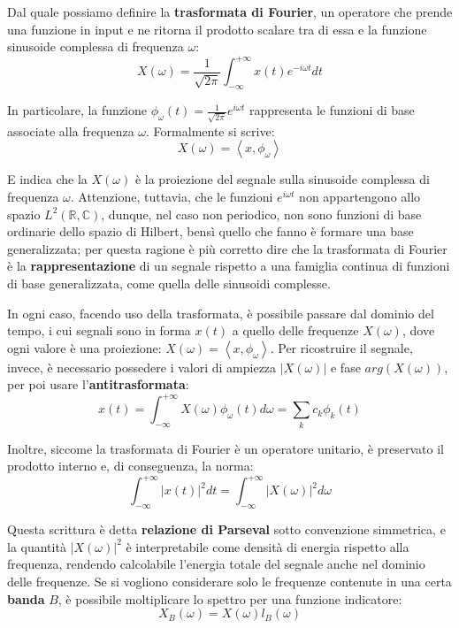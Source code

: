 \noindent Dal quale possiamo definire la \textbf{trasformata di Fourier}, un operatore che prende una funzione in input e ne ritorna il prodotto
scalare tra di essa e la funzione sinusoide complessa di frequenza $\omega$: \[
    X(\omega) = \frac{1}{\sqrt{2\pi}}\int_{-\infty}^{+\infty} x(t)e^{-i\omega t} dt
\]

\noindent In particolare, la funzione $\phi_\omega(t) = \frac{1}{\sqrt{2\pi}}e^{i\omega t}$ rappresenta le funzioni di base associate alla frequenza
$\omega$. Formalmente si scrive: \[
    X(\omega) = \left<x, \phi_\omega \right>
\]

\noindent E indica che la $X(\omega)$ è la proiezione del segnale sulla sinusoide complessa di frequenza $\omega$. Attenzione, tuttavia, che le funzioni
$e^{i\omega t}$ non appartengono allo spazio $L^2(\mathbb{R}, \mathbb{C})$, dunque, nel caso non periodico, non sono funzioni di base ordinarie dello
spazio di Hilbert, bensì quello che fanno è formare una base generalizzata; per questa ragione è più corretto dire che la trasformata di Fourier è la
\textbf{rappresentazione} di un segnale rispetto a una famiglia continua di funzioni di base generalizzata, come quella delle sinusoidi complesse.\par
In ogni caso, facendo uso della trasformata, è possibile passare dal dominio del tempo, i cui segnali sono in forma $x(t)$ a quello delle frequenze
$X(\omega)$, dove ogni valore è una proiezione: $X(\omega) = \left<x, \phi_\omega \right>$. Per ricostruire il segnale, invece, è necessario possedere i
valori di ampiezza $|X(\omega)|$ e fase $arg(X(\omega))$, per poi usare l'\textbf{antitrasformata}: \[
    x(t) = \int_{-\infty}^{+\infty} X(\omega)\phi_\omega(t) d\omega = \sum_k c_k\phi_k(t)
\]

\noindent Inoltre, siccome la trasformata di Fourier è un operatore unitario, è preservato il prodotto interno e, di conseguenza, la norma: \[
    \int_{-\infty}^{+\infty} |x(t)|^2 dt = \int_{-\infty}^{+\infty} |X(\omega)|^2 d\omega
\]

\noindent Questa scrittura è detta \textbf{relazione di Parseval} sotto convenzione simmetrica, e la quantità $|X(\omega)|^2$ è interpretabile come
densità di energia rispetto alla frequenza, rendendo calcolabile l'energia totale del segnale anche nel dominio delle frequenze. Se si vogliono
considerare solo le frequenze contenute in una certa \textbf{banda} $B$, è possibile moltiplicare lo spettro per una funzione indicatore: \[
    X_B(\omega) = X(\omega)l_B(\omega)
\]

